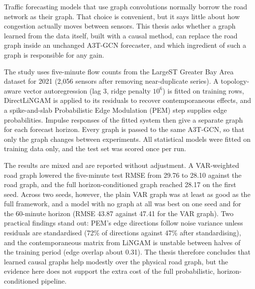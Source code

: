 \documentclass[MTech]{ugthesis}
\begin{document}
\abstract
\begin{doublespacing}
\normalfont
{\noindent Traffic forecasting models that use graph convolutions normally borrow the road network as their graph. That choice is convenient, but it says little about how congestion actually moves between sensors. This thesis asks whether a graph learned from the data itself, built with a causal method, can replace the road graph inside an unchanged A3T-GCN forecaster, and which ingredient of such a graph is responsible for any gain.

The study uses five-minute flow counts from the LargeST Greater Bay Area dataset for 2021 (2,056 sensors after removing near-duplicate series). A topology-aware vector autoregression (lag 3, ridge penalty $10^{6}$) is fitted on training rows, DirectLiNGAM is applied to its residuals to recover contemporaneous effects, and a spike-and-slab Probabilistic Edge Modulation (PEM) step supplies edge probabilities. Impulse responses of the fitted system then give a separate graph for each forecast horizon. Every graph is passed to the same A3T-GCN, so that only the graph changes between experiments. All statistical models were fitted on training data only, and the test set was scored once per run.

The results are mixed and are reported without adjustment. A VAR-weighted road graph lowered the five-minute test RMSE from 29.76 to 28.10 against the road graph, and the full horizon-conditioned graph reached 28.17 on the first seed. Across two seeds, however, the plain VAR graph was at least as good as the full framework, and a model with no graph at all was best on one seed and for the 60-minute horizon (RMSE 43.87 against 47.41 for the VAR graph). Two practical findings stand out: PEM's edge directions follow noise variance unless residuals are standardised (72\% of directions against 47\% after standardising), and the contemporaneous matrix from LiNGAM is unstable between halves of the training period (edge overlap about 0.31). The thesis therefore concludes that learned causal graphs help modestly over the physical road graph, but the evidence here does not support the extra cost of the full probabilistic, horizon-conditioned pipeline.}\\

\end{doublespacing}

\newpage
\tableofcontents
\newpage
\listoffigures
\newpage
\listoftables
\newpage
\end{document}
